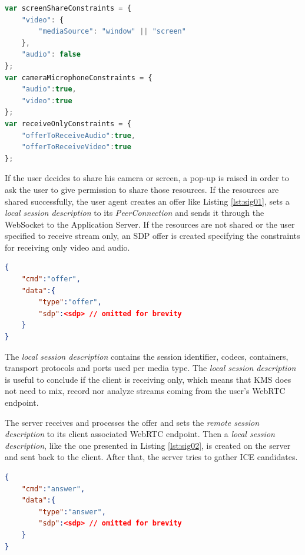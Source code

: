 \begin{minipage}{\linewidth}
\begin{lstlisting}[caption={Media constraints},label={lst:constraints},language=JavaScript]
var screenShareConstraints = {	
	"video": {
		"mediaSource": "window" || "screen"
	}, 
	"audio": false
};
var cameraMicrophoneConstraints = {
	"audio":true, 
	"video":true 
};
var receiveOnlyConstraints = {
	"offerToReceiveAudio":true,
	"offerToReceiveVideo":true
};
\end{lstlisting}
\end{minipage}

If the user decides to share his camera or screen, a pop-up is raised in order to ask the user to give permission to share those resources. If the resources are shared successfully, the user agent creates an offer like Listing \ref{lst:sig01}, sets a \emph{local session description} to its \emph{PeerConnection} and sends it through the WebSocket to the Application Server.
If the resources are not shared or the user specified to receive stream only, an \ac{SDP} offer is created specifying the constraints for receiving only video and audio.

\begin{minipage}{\linewidth}
\begin{lstlisting}[caption={Offer created by client},label={lst:sig01},language=json]
{
	"cmd":"offer",
	"data":{
		"type":"offer",
		"sdp":<sdp>	// omitted for brevity
	}
}
\end{lstlisting}
\end{minipage}

The \emph{local session description} contains the session identifier, codecs, containers, transport protocols and ports used per media type. The \emph{local session description} is useful to conclude if the client is receiving only, which means that \ac{KMS} does not need to mix, record nor analyze streams coming from the user's \ac{WebRTC} endpoint. 

The server receives and processes the offer and sets the \emph{remote session description} to its client associated \ac{WebRTC} endpoint. Then a \emph{local session description}, like the one presented in Listing \ref{lst:sig02}, is created on the server and sent back to the client. After that, the server tries to gather \ac{ICE} candidates.

\begin{minipage}{\linewidth}
\begin{lstlisting}[caption={Answer created by KMS},label={lst:sig02},language=json]
{
	"cmd":"answer",
	"data":{
		"type":"answer",
		"sdp":<sdp>	// omitted for brevity
	}
}
\end{lstlisting}
\end{minipage}

